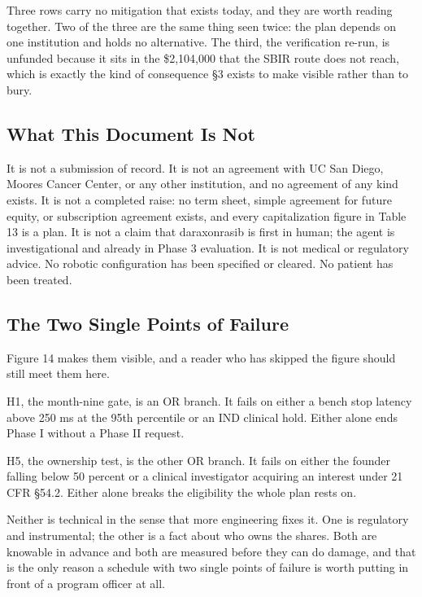 Three rows carry no mitigation that exists today, and they are worth reading
together. Two of the three are the same thing seen twice: the plan depends on
one institution and holds no alternative. The third, the verification re-run, is
unfunded because it sits in the \$2,104,000 that the SBIR route does not reach,
which is exactly the kind of consequence \S3 exists to make visible rather than
to bury.

\subsection{What This Document Is Not}

It is not a submission of record. It is not an agreement with UC San Diego,
Moores Cancer Center, or any other institution, and no agreement of any kind
exists. It is not a completed raise: no term sheet, simple agreement for future
equity, or subscription agreement exists, and every capitalization figure in
Table 13 is a plan. It is not a claim that daraxonrasib is first in human; the
agent is investigational and already in Phase 3 evaluation. It is not medical or
regulatory advice. No robotic configuration has been specified or cleared. No
patient has been treated.

\subsection{The Two Single Points of Failure}

Figure 14 makes them visible, and a reader who has skipped the figure should
still meet them here.

H1, the month-nine gate, is an OR branch. It fails on either a bench stop
latency above 250 ms at the 95th percentile or an IND clinical hold. Either
alone ends Phase I without a Phase II request.

H5, the ownership test, is the other OR branch. It fails on either the founder
falling below 50 percent or a clinical investigator acquiring an interest under
21 CFR \S54.2. Either alone breaks the eligibility the whole plan rests on.

Neither is technical in the sense that more engineering fixes it. One is
regulatory and instrumental; the other is a fact about who owns the shares. Both
are knowable in advance and both are measured before they can do damage, and
that is the only reason a schedule with two single points of failure is worth
putting in front of a program officer at all.
